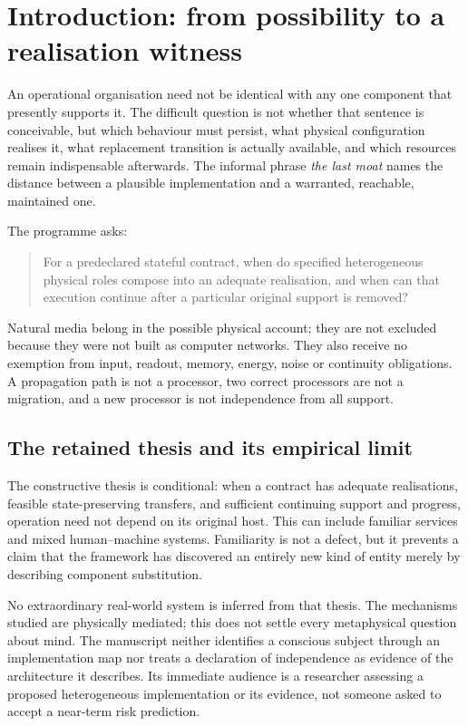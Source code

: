 \documentclass[11pt,a4paper]{article}
\theoremstyle{definition}
\theoremstyle{remark}
\begin{document}
\section{Introduction: from possibility to a realisation witness}
An operational organisation need not be identical with any one component that presently supports it. The difficult question is not whether that sentence is conceivable, but which behaviour must persist, what physical configuration realises it, what replacement transition is actually available, and which resources remain indispensable afterwards. The informal phrase \emph{the last moat} names the distance between a plausible implementation and a warranted, reachable, maintained one.

The programme asks:
\begin{quote}
For a predeclared stateful contract, when do specified heterogeneous physical roles compose into an adequate realisation, and when can that execution continue after a particular original support is removed?
\end{quote}
Natural media belong in the possible physical account; they are not excluded because they were not built as computer networks. They also receive no exemption from input, readout, memory, energy, noise or continuity obligations. A propagation path is not a processor, two correct processors are not a migration, and a new processor is not independence from all support.

\subsection{The retained thesis and its empirical limit}
The constructive thesis is conditional: when a contract has adequate realisations, feasible state-preserving transfers, and sufficient continuing support and progress, operation need not depend on its original host. This can include familiar services and mixed human--machine systems. Familiarity is not a defect, but it prevents a claim that the framework has discovered an entirely new kind of entity merely by describing component substitution.

No extraordinary real-world system is inferred from that thesis. The mechanisms studied are physically mediated; this does not settle every metaphysical question about mind. The manuscript neither identifies a conscious subject through an implementation map nor treats a declaration of independence as evidence of the architecture it describes. Its immediate audience is a researcher assessing a proposed heterogeneous implementation or its evidence, not someone asked to accept a near-term risk prediction.
\end{document}
